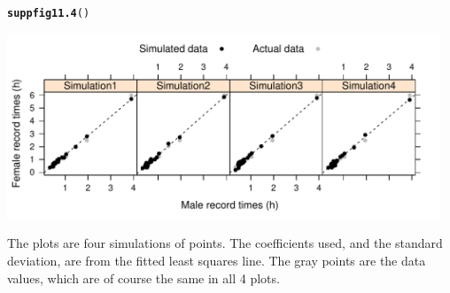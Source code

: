 \documentclass[12pt, a4paper,  BCOR=8.25mm, DIV=15]{scrartcl}\usepackage[]{graphicx}\usepackage[]{color}
\makeatletter
\newcommand{\hlstd}[1]{\textcolor[rgb]{0.345,0.345,0.345}{#1}}%
\newcommand{\hlkwd}[1]{\textcolor[rgb]{0.737,0.353,0.396}{\textbf{#1}}}%
\newenvironment{kframe}{%
 \def\at@end@of@kframe{}%
 \ifinner\ifhmode%
  \def\at@end@of@kframe{\end{minipage}}%
  \begin{minipage}{\columnwidth}%
 \fi\fi%
 \def\FrameCommand##1{\hskip\@totalleftmargin \hskip-\fboxsep
 \colorbox{shadecolor}{##1}\hskip-\fboxsep
     \hskip-\linewidth \hskip-\@totalleftmargin \hskip\columnwidth}%
 \MakeFramed {\advance\hsize-\width
   \@totalleftmargin\z@ \linewidth\hsize
   \@setminipage}}%
 {\par\unskip\endMakeFramed%
 \at@end@of@kframe}
\newenvironment{knitrout}{}{} %
\makeatother
\begin{document}
\begin{suppfigure}[H]
\begin{knitrout}
\color{fgcolor}\begin{kframe}
\begin{alltt}
\hlkwd{suppfig11.4}\hlstd{()}
\end{alltt}
\end{kframe}

{\centering \includegraphics[width=0.97\textwidth]{figs/reg-mftime-sims-s11_4-1} 

}



\end{knitrout}
\vspace*{-9pt}

\caption{The plots are four simulations of points.  The coefficients
  used, and the standard deviation, are from the fitted least squares
  line. The gray points are the data values, which are of course the
same in all 4 plots.}\label{fig:4sim-nimff}
\end{suppfigure}
\end{document}

